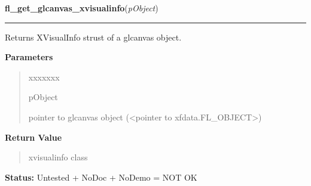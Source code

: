     \label{xformslib:library:fl_get_glcanvas_xvisualinfo}

    \vspace{0.5ex}

\hspace{.8\funcindent}\begin{boxedminipage}{\funcwidth}

    \raggedright \textbf{fl\_get\_glcanvas\_xvisualinfo}(\textit{pObject})

    \vspace{-1.5ex}

    \rule{\textwidth}{0.5\fboxrule}
\setlength{\parskip}{2ex}
    Returns XVisualInfo strust of a glcanvas object.

\setlength{\parskip}{1ex}
      \textbf{Parameters}
      \vspace{-1ex}

      \begin{quote}
        \begin{Ventry}{xxxxxxx}

          \item[pObject]

          pointer to glcanvas object ({\textless}pointer to 
          xfdata.FL\_OBJECT{\textgreater})

        \end{Ventry}

      \end{quote}

      \textbf{Return Value}
    \vspace{-1ex}

      \begin{quote}
      xvisualinfo class

      \end{quote}

\textbf{Status:} Untested + NoDoc + NoDemo = NOT OK



    \end{boxedminipage}

    \label{xformslib:library:fl_get_glcanvas_context}

    \vspace{0.5ex}

